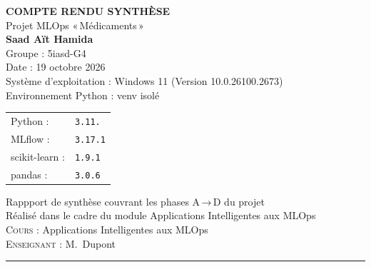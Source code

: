 \documentclass[12pt,a4paper]{report}
\newcommand{\version}[1]{\texttt{#1}}
\begin{document}
\begin{titlepage}
    \centering
    \vspace{2cm}
    
    {\LARGE \bfseries COMPTE RENDU SYNTHÈSE} \\
    \vspace{0.5cm}
    {\large Projet MLOps « Médicaments »} \\
    \vspace{1cm}
    {\Large \textbf{Saad Aït Hamida}} \\
    \vspace{0.5cm}
    {\large Groupe : 5iasd-G4} \\
    \vspace{1cm}
    {\large Date : 19 octobre 2026} \\
    \vspace{0.5cm}
    {\large Système d'exploitation : Windows 11 (Version 10.0.26100.2673)} \\
    \vspace{0.5cm}
    {\large Environnement Python : venv isolé} \\
    \vspace{0.3cm}
    \begin{tabular}{ll}
        Python : & \version{3.11.} \\
        MLflow : & \version{3.17.1} \\
        scikit-learn : & \version{1.9.1} \\
        pandas : & \version{3.0.6} \\
    \end{tabular}
    \vspace{2cm}
    
    {\large Rappport de synthèse couvrant les phases A → D du projet} \\
    \vspace{0.5cm}
    {\large Réalisé dans le cadre du module Applications Intelligentes aux MLOps} \\
    
    \vfill
    {\large \textsc{Cours :} Applications Intelligentes aux MLOps} \\
    {\large \textsc{Enseignant :} M.~Dupont} \\
    
    \vspace{1cm}
    {\rule{0.8\textwidth}{0.5pt}}
\end{titlepage}

\setcounter{page}{1}
\end{document}

